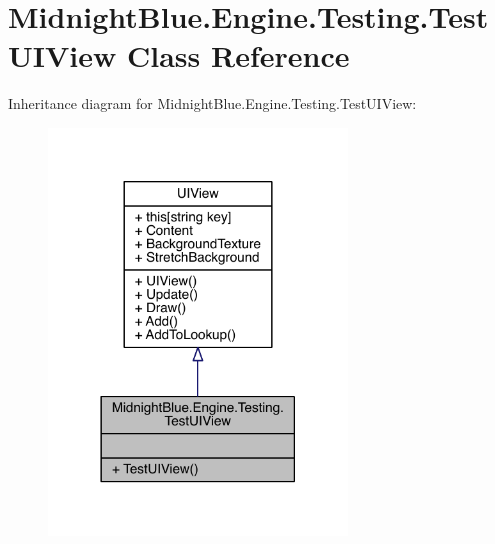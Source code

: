 \hypertarget{class_midnight_blue_1_1_engine_1_1_testing_1_1_test_u_i_view}{}\section{Midnight\+Blue.\+Engine.\+Testing.\+Test\+U\+I\+View Class Reference}
\label{class_midnight_blue_1_1_engine_1_1_testing_1_1_test_u_i_view}


Inheritance diagram for Midnight\+Blue.\+Engine.\+Testing.\+Test\+U\+I\+View\+:
\nopagebreak
\begin{figure}[H]
\begin{center}
\leavevmode
\includegraphics[width=225pt]{class_midnight_blue_1_1_engine_1_1_testing_1_1_test_u_i_view__inherit__graph}
\end{center}
\end{figure}


